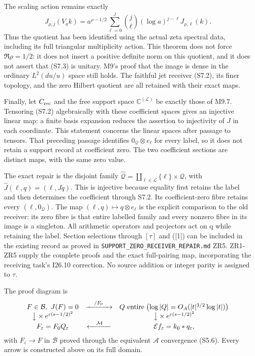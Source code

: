 \documentclass[
]{article}
\begin{document}
The scaling action remains exactly \[
J_{\rho,j}(V_a k)=a^{\rho-1/2}
\sum_{\ell=0}^j\binom j\ell(\log a)^{j-\ell}J_{\rho,\ell}(k).
\tag{S7.3}
\] Thus the quotient has been identified using the actual zeta spectral
data, including its full triangular multiplicity action. This theorem
does not force \(\Re\rho=1/2\): it does not insert a positive definite
norm on this quotient, and it does not assert that (S7.3) is unitary.
M9's proof that the image is dense in the ordinary \(L^2(du/u)\) space
still holds. The faithful jet receiver (S7.2), its finer topology, and
the zero Hilbert quotient are all retained with their exact maps.

Finally, let \(C_{\rm rec}\) and the free support space
\(\mathbb C^{(\mathcal L)}\) be exactly those of M9.7. Tensoring (S7.2)
algebraically with these coefficient spaces gives an injective linear
map: a finite basis expansion reduces the assertion to injectivity of
\(J\) in each coordinate. This statement concerns the linear spaces
after passage to tensors. That preceding passage identifies
\(0_{\mathcal Q}\otimes e_\ell\) for every label, so it does not retain
a support record at coefficient zero. The two coefficient sections are
distinct maps, with the same zero value.

The exact repair is the disjoint family
\(\widehat{\mathcal Q}=\coprod_{\ell\in\mathcal L}\{\ell\}\times\mathcal Q\),
with \(\widehat J(\ell,q)=(\ell,Jq)\). This is injective because
equality first retains the label and then determines the coefficient
through S7.2. Its coefficient-zero fibre retains every
\((\ell,0_{\mathcal Q})\). The map \((\ell,q)\mapsto q\otimes e_\ell\)
is the explicit comparison to the old receiver: its zero fibre is that
entire labelled family and every nonzero fibre in its image is a
singleton. All arithmetic operators and projectors act on q while
retaining the label. Section selections through \([\tau]\) and ({[}1{]})
can be included in the existing record as proved in
\nolinkurl{SUPPORT_ZERO_RECEIVER_REPAIR.md} ZR5. ZR1-ZR5 supply the complete
proofs and the exact full-pairing map, incorporating the receiving
task's I26.10 correction. No source addition or integer parity is
assigned to \(\tau\).

The proof diagram is \[
\begin{array}{ccc}
F\in\mathcal B,\ J(F)=0
&\xrightarrow{\quad /F_0\quad}&Q\text{ entire}\;\bigl(\log|Q|=O_A(|t|^{3/2}\log|t|)\bigr)\\
\big\downarrow\times e^{\varepsilon(s-1/2)^2}
&&\big\downarrow\times e^{\varepsilon(s-1/2)^2}\\
F_\varepsilon=F_0Q_\varepsilon
&\xleftarrow{\quad\mathcal M\quad}&
\mathcal E f_\varepsilon=k_0*q_\varepsilon,
\end{array}
\] with \(F_\varepsilon\to F\) in \(\mathcal B\) proved through the
equivalent \(\mathcal A\) convergence (S5.6). Every arrow is constructed
above on its full domain.
\end{document}
